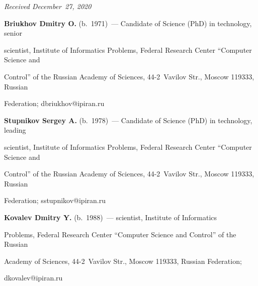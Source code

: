 \vspace*{-3pt}



  \hfill{\small\textit{Received December~27, 2020}}











\Contr



\noindent

\textbf{Briukhov Dmitry O.} (b.\ 1971)~--- Candidate of Science (PhD) in technology, senior 

scientist, Institute of Informatics Problems, Federal Research Center ``Computer Science and 

Control'' of the Russian Academy of Sciences, 44-2~Vavilov Str., Moscow 119333, Russian 

Federation; \mbox{dbriukhov@ipiran.ru}



\vspace*{3pt}



\noindent

\textbf{Stupnikov Sergey A.} (b.\ 1978)~--- Candidate of Science (PhD) in technology, leading 

scientist, Institute of Informatics Problems, Federal Research Center ``Computer Science and 

Control'' of the Russian Academy of Sciences, 44-2~Vavilov Str., Moscow 119333, Russian 

Federation; \mbox{sstupnikov@ipiran.ru}

    

\vspace*{3pt}



\noindent

    \textbf{Kovalev Dmitry Y.} (b.\ 1988)~--- scientist, Institute of Informatics 

Problems, Federal Research Center ``Computer Science and Control'' of the Russian 

Academy of Sciences, 44-2~Vavilov Str.,  Moscow 119333, Russian Federation; 

\mbox{dkovalev@ipiran.ru}

    

    


